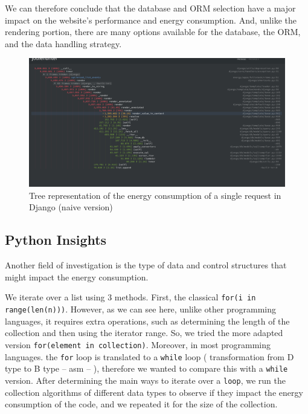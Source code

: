 We can therefore conclude that the database and ORM selection have a major impact on the website's performance and energy consumption.
And, unlike the rendering portion, there are many options available for the database, the ORM, and the data handling strategy.

\begin{figure}[!hbt]
    \centering
    \includegraphics[width=\linewidth]{imgs/django_profiled_optimized}
    \caption{Tree representation of the energy consumption of a single request in Django (naive version)}
    \label{fig:django_profiled_optimized}
\end{figure}




\subsection{Python Insights}
Another field of investigation is the type of data and control structures that might impact the energy consumption.


We iterate over a list using 3 methods.
First, the classical \texttt{for(i in range(len(n)))}.
However, as we can see here, unlike other programming languages, it requires extra operations, such as determining the length of the collection and then using the iterator range.
So, we tried the more adapted version \texttt{for(element in collection)}.
Moreover, in most programming languages. the \texttt{for} loop is translated to a \texttt{while} loop ( transformation from D type to B type -- asm -- ), therefore we wanted to compare this with a \texttt{while} version.
After determining the main ways to iterate over a \texttt{loop}, we run the collection algorithms of different data types to observe if they impact the energy consumption of the code, and we repeated it for the size of the collection.

